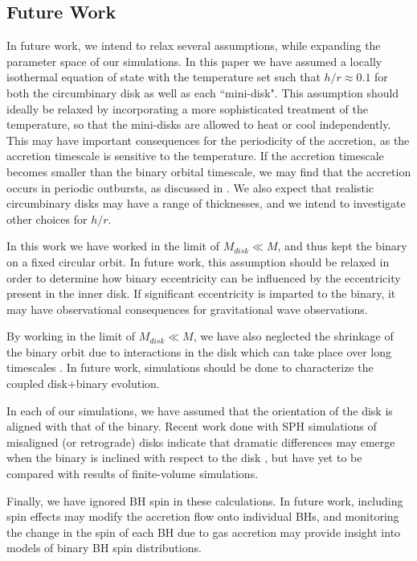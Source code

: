 \documentclass[apj]{emulateapj}
\begin{document}
\subsection{Future Work}
In future work, we intend to relax several assumptions, while expanding the parameter space of our simulations. In this paper we have assumed a locally isothermal equation of state with the temperature set such that $h/r \approx 0.1$ for both the circumbinary disk as well as each ``mini-disk". This assumption should ideally be relaxed by incorporating a more sophisticated treatment of the temperature, so that the mini-disks are allowed to heat or cool independently. This may have important consequences for the periodicity of the accretion, as the accretion timescale is sensitive to the temperature. If the accretion timescale becomes smaller than the binary orbital timescale, we may find that the accretion occurs in periodic outbursts, as discussed in \citep{tanaka13}. We also expect that realistic circumbinary disks may have a range of thicknesses, and we intend to investigate other choices for $h/r$.

In this work we have worked in the limit of $M_{disk} \ll M$, and thus kept the binary on a fixed circular orbit. In future work, this assumption should be relaxed in order to determine how binary eccentricity can be influenced by the eccentricity present in the inner disk. If significant eccentricity is imparted to the binary, it may have observational consequences for gravitational wave observations.

By working in the limit of $M_{disk} \ll M$, we have also neglected the shrinkage of the binary orbit due to interactions in the disk which can take place over long timescales \citep{kocsis12a,kocsis12b}. In future work, simulations should be done to characterize the coupled disk+binary evolution.

In each of our simulations, we have assumed that the orientation of the disk is aligned with that of the binary. Recent work done with SPH simulations of misaligned (or retrograde) disks indicate that dramatic differences may emerge when the binary is inclined with respect to the disk \citep{nixon13,roedig13}, but have yet to be compared with results of finite-volume simulations. 

Finally, we have ignored BH spin in these calculations. In future work, including spin effects may modify the accretion flow onto individual BHs, and monitoring the change in the spin of each BH due to gas accretion may provide insight into models of binary BH spin distributions.
\end{document}
